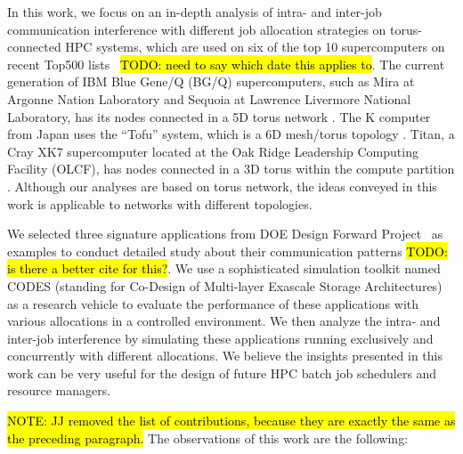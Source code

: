 \documentclass[conference]{IEEEtran}
\newcommand{\TODO}[1]{\hl{TODO: #1}}
\newcommand{\NOTE}[1]{\hl{NOTE: #1}}
\begin{document}
In this work, we focus on an in-depth analysis of intra- and inter-job communication interference with different job allocation strategies on torus-connected HPC systems, which are used on six of the top 10 supercomputers on recent Top500 lists~\cite{top500} \TODO{need to say which date this applies to}. The current generation of IBM Blue Gene/Q (BG/Q) supercomputers, such as Mira at Argonne Nation Laboratory and Sequoia at Lawrence Livermore National Laboratory, has its nodes connected in a 5D torus network \cite{bgq}. The K computer from Japan uses the ``Tofu'' system, which is a 6D mesh/torus topology \cite{tofu}. Titan, a Cray XK7 supercomputer located at the Oak Ridge Leadership Computing Facility (OLCF), has nodes connected in a 3D torus within the compute partition \cite{titan}. Although our analyses are based on torus network, the ideas conveyed in this work is applicable to networks with different topologies. 

We selected three signature applications from DOE Design Forward Project~\cite{designforwardwebpage} as examples to conduct detailed study about their communication patterns \TODO{is there a better cite for this?}. We use a sophisticated simulation toolkit named CODES (standing for Co-Design of Multi-layer Exascale Storage Architectures)~\cite{Jason-2011} as a research vehicle to evaluate the performance of these applications with various allocations in a controlled environment. We then analyze the intra- and inter-job interference by simulating these applications running exclusively and concurrently with different allocations. We believe the insights presented in this work can be very useful for the design of future HPC batch job schedulers and resource managers.


\NOTE{JJ removed the list of contributions, because they are exactly the same as the preceding paragraph.}
The observations of this work are the following:

\end{document}
